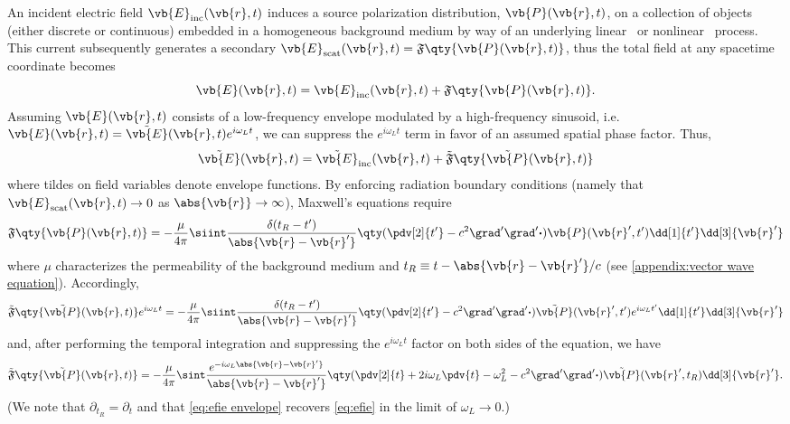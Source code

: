 An incident electric field $\vb{E}_\text{inc}(\vb{r}, t)$ induces a source polarization distribution, $\vb{P}(\vb{r}, t)$, on a collection of objects (either discrete or continuous) embedded in a homogeneous background medium by way of an underlying linear~\cite{} or nonlinear~\cite{Glosser2017} process.
This current subsequently generates a secondary $\vb{E}_\text{scat}(\vb{r}, t) = \mathfrak{F}\qty{\vb{P}(\vb{r}, t)}$, thus the total field at any spacetime coordinate becomes
\begin{equation}
  \vb{E}(\vb{r}, t) = \vb{E}_\text{inc}(\vb{r}, t) + \mathfrak{F}\qty{\vb{P}(\vb{r}, t)}.
\end{equation}
Assuming $\vb{E}(\vb{r}, t)$ consists of a low-frequency envelope modulated by a high-frequency sinusoid, i.e. $\vb{E}(\vb{r}, t) = \tilde{\vb{E}}(\vb{r}, t) e^{i \omega_L t}$, we can suppress the $e^{i \omega_L t}$ term in favor of an assumed spatial phase factor.
Thus,
\begin{equation}
  \tilde{\vb{E}}(\vb{r}, t) = \tilde{\vb{E}}_\text{inc}(\vb{r}, t) + \tilde{\mathfrak{F}}\qty{\tilde{\vb{P}}(\vb{r}, t)}
\end{equation}
where tildes on field variables denote envelope functions.
By enforcing radiation boundary conditions (namely that $\vb{E}_\text{scat}(\vb{r}, t) \to 0$ as $\abs{\vb{r}} \to \infty$), Maxwell's equations require
\begin{equation}
  \mathfrak{F}\qty{\vb{P}(\vb{r}, t)} = -\frac{\mu}{4\pi} \siint \frac{\delta(t_R - t')}{\abs{\vb{r} - \vb{r}'}} \qty(\pdv[2]{{t'}} - c^2 \grad' \grad'\boldsymbol{\cdot}) \vb{P}(\vb{r}', t') \dd[1]{t'} \dd[3]{\vb{r}'}
  \label{eq:efie}
\end{equation}
where $\mu$ characterizes the permeability of the background medium and $t_R \equiv t - \abs{\vb{r} - \vb{r}'}/c$ (see \cref{appendix:vector wave equation}).
Accordingly,
\begin{equation}
  \tilde{\mathfrak{F}}\qty{\tilde{\vb{P}}(\vb{r}, t)}e^{i \omega_L t} = -\frac{\mu}{4\pi} \siint \frac{\delta(t_R - t')}{\abs{\vb{r} - \vb{r}'}} \qty(\pdv[2]{{t'}} - c^2 \grad' \grad'\boldsymbol{\cdot}) \tilde{\vb{P}}(\vb{r}', t') e^{i \omega_L t'} \dd[1]{t'} \dd[3]{\vb{r}'}
  \label{eq:efie envelope}
\end{equation}
and, after performing the temporal integration and suppressing the $e^{i \omega_L t}$ factor on both sides of the equation, we have
\begin{equation}
  \tilde{\mathfrak{F}}\qty{\tilde{\vb{P}}(\vb{r}, t)} = -\frac{\mu}{4\pi} \sint \frac{e^{- i \omega_L \abs{\vb{r} - \vb{r}'}}}{\abs{\vb{r} - \vb{r}'}} \qty(\pdv[2]{t} + 2 i \omega_L \pdv{t} - \omega_L^2 - c^2 \grad' \grad'\boldsymbol{\cdot}) \tilde{\vb{P}}(\vb{r}', t_R) \dd[3]{\vb{r}'}.
  \label{eq:efie envelope}
\end{equation}
(We note that $\partial_{t_R} = \partial_{t}$ and that \cref{eq:efie envelope} recovers \cref{eq:efie} in the limit of $\omega_L \to 0$.)

